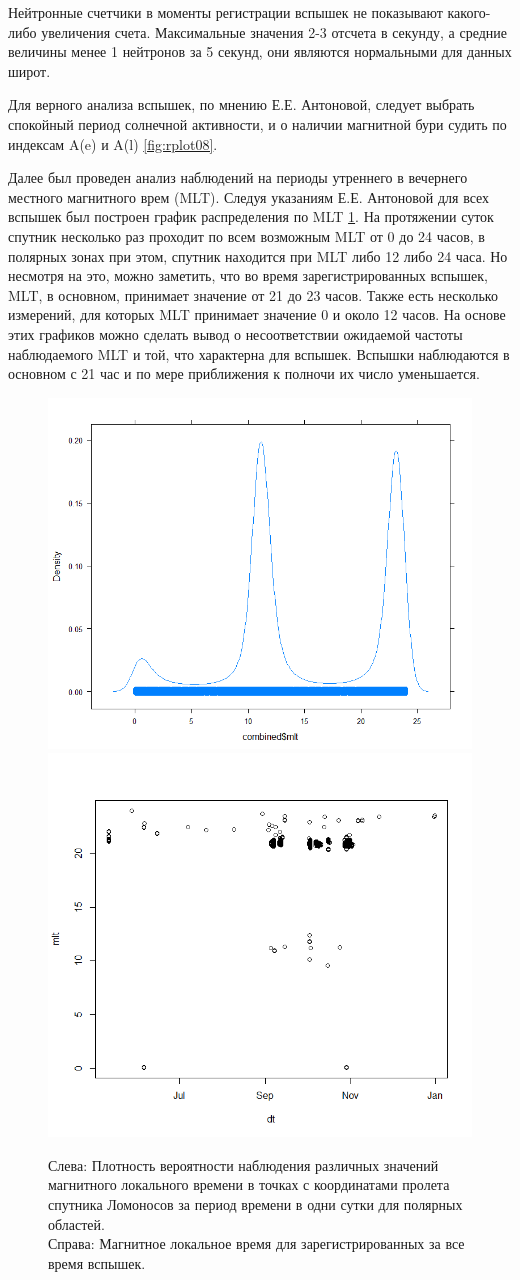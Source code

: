 Нейтронные счетчики в моменты регистрации вспышек не показывают какого-либо увеличения счета. Максимальные значения 2-3 отсчета в секунду, а средние величины менее 1 нейтронов за 5 секунд, они являются нормальными для данных широт. 

Для верного анализа вспышек, по мнению Е.Е. Антоновой, следует выбрать спокойный период солнечной активности, и о наличии магнитной бури судить по индексам A(e) и A(l) \ref{fig:rplot08}. 

Далее был проведен анализ наблюдений на периоды утреннего в вечернего местного магнитного врем (MLT). Следуя указаниям  Е.Е. Антоновой для всех вспышек был построен график распределения по MLT \ref{fig:rplot15}. На протяжении суток спутник несколько раз проходит по всем возможным MLT от 0 до 24 часов, в полярных зонах при этом, спутник находится при MLT либо 12 либо 24 часа. Но несмотря на это, можно заметить, что во время зарегистрированных вспышек, MLT,  в основном, принимает значение от 21 до 23 часов. Также есть несколько измерений, для которых MLT принимает значение 0 и около 12 часов. На основе этих графиков можно сделать вывод о несоответствии ожидаемой частоты наблюдаемого MLT и той, что характерна для вспышек. Вспышки наблюдаются в основном с 21 час и по мере приближения к полночи их число уменьшается.


\begin{figure}
	\centering
	\includegraphics[width=0.49\linewidth]{images/Flash/Rplot020}
	\includegraphics[width=0.49\linewidth]{images/Flash/Rplot14}
	\caption{Слева: Плотность вероятности наблюдения различных значений магнитного локального времени в точках с координатами пролета спутника Ломоносов за период времени в одни сутки для полярных областей. \\Справа: Магнитное локальное время для зарегистрированных за все время вспышек.}
	\label{fig:rplot15}
\end{figure}


